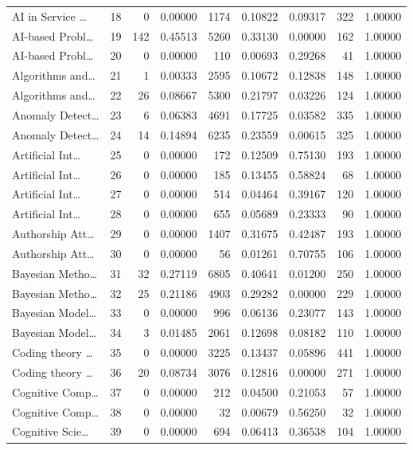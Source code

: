 \begin{table}
\begin{tabular}{lrrrrrrrr}
AI in Service … & 18 & 0 & 0.00000 & 1174 & 0.10822 & 0.09317 & 322 & 1.00000 \\
AI-based Probl… & 19 & 142 & 0.45513 & 5260 & 0.33130 & 0.00000 & 162 & 1.00000 \\
AI-based Probl… & 20 & 0 & 0.00000 & 110 & 0.00693 & 0.29268 & 41 & 1.00000 \\
Algorithms and… & 21 & 1 & 0.00333 & 2595 & 0.10672 & 0.12838 & 148 & 1.00000 \\
Algorithms and… & 22 & 26 & 0.08667 & 5300 & 0.21797 & 0.03226 & 124 & 1.00000 \\
Anomaly Detect… & 23 & 6 & 0.06383 & 4691 & 0.17725 & 0.03582 & 335 & 1.00000 \\
Anomaly Detect… & 24 & 14 & 0.14894 & 6235 & 0.23559 & 0.00615 & 325 & 1.00000 \\
Artificial Int… & 25 & 0 & 0.00000 & 172 & 0.12509 & 0.75130 & 193 & 1.00000 \\
Artificial Int… & 26 & 0 & 0.00000 & 185 & 0.13455 & 0.58824 & 68 & 1.00000 \\
Artificial Int… & 27 & 0 & 0.00000 & 514 & 0.04464 & 0.39167 & 120 & 1.00000 \\
Artificial Int… & 28 & 0 & 0.00000 & 655 & 0.05689 & 0.23333 & 90 & 1.00000 \\
Authorship Att… & 29 & 0 & 0.00000 & 1407 & 0.31675 & 0.42487 & 193 & 1.00000 \\
Authorship Att… & 30 & 0 & 0.00000 & 56 & 0.01261 & 0.70755 & 106 & 1.00000 \\
Bayesian Metho… & 31 & 32 & 0.27119 & 6805 & 0.40641 & 0.01200 & 250 & 1.00000 \\
Bayesian Metho… & 32 & 25 & 0.21186 & 4903 & 0.29282 & 0.00000 & 229 & 1.00000 \\
Bayesian Model… & 33 & 0 & 0.00000 & 996 & 0.06136 & 0.23077 & 143 & 1.00000 \\
Bayesian Model… & 34 & 3 & 0.01485 & 2061 & 0.12698 & 0.08182 & 110 & 1.00000 \\
Coding theory … & 35 & 0 & 0.00000 & 3225 & 0.13437 & 0.05896 & 441 & 1.00000 \\
Coding theory … & 36 & 20 & 0.08734 & 3076 & 0.12816 & 0.00000 & 271 & 1.00000 \\
Cognitive Comp… & 37 & 0 & 0.00000 & 212 & 0.04500 & 0.21053 & 57 & 1.00000 \\
Cognitive Comp… & 38 & 0 & 0.00000 & 32 & 0.00679 & 0.56250 & 32 & 1.00000 \\
Cognitive Scie… & 39 & 0 & 0.00000 & 694 & 0.06413 & 0.36538 & 104 & 1.00000 \\

\end{tabular}
\end{table}

